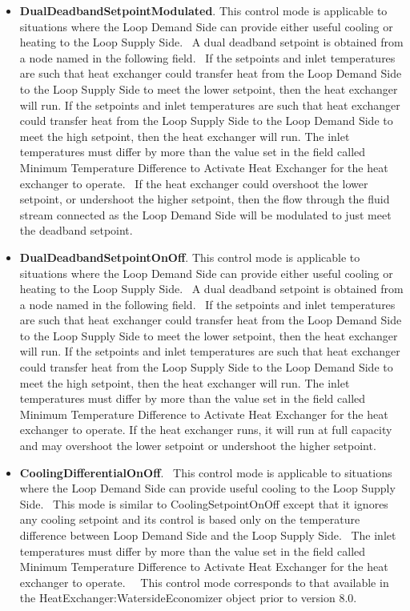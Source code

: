 \begin{itemize}
\item
  \textbf{DualDeadbandSetpointModulated}. This control mode is applicable to situations where the Loop Demand Side can provide either useful cooling or heating to the Loop Supply Side.~ A dual deadband setpoint is obtained from a node named in the following field.~ If the setpoints and inlet temperatures are such that heat exchanger could transfer heat from the Loop Demand Side to the Loop Supply Side to meet the lower setpoint, then the heat exchanger will run. If the setpoints and inlet temperatures are such that heat exchanger could transfer heat from the Loop Supply Side to the Loop Demand Side to meet the high setpoint, then the heat exchanger will run. The inlet temperatures must differ by more than the value set in the field called Minimum Temperature Difference to Activate Heat Exchanger for the heat exchanger to operate.~ If the heat exchanger could overshoot the lower setpoint, or undershoot the higher setpoint, then the flow through the fluid stream connected as the Loop Demand Side will be modulated to just meet the deadband setpoint.
\item
  \textbf{DualDeadbandSetpointOnOff}. This control mode is applicable to situations where the Loop Demand Side can provide either useful cooling or heating to the Loop Supply Side.~ A dual deadband setpoint is obtained from a node named in the following field.~ If the setpoints and inlet temperatures are such that heat exchanger could transfer heat from the Loop Demand Side to the Loop Supply Side to meet the lower setpoint, then the heat exchanger will run. If the setpoints and inlet temperatures are such that heat exchanger could transfer heat from the Loop Supply Side to the Loop Demand Side to meet the high setpoint, then the heat exchanger will run. The inlet temperatures must differ by more than the value set in the field called Minimum Temperature Difference to Activate Heat Exchanger for the heat exchanger to operate. If the heat exchanger runs, it will run at full capacity and may overshoot the lower setpoint or undershoot the higher setpoint.
\item
  \textbf{CoolingDifferentialOnOff}.~ This control mode is applicable to situations where the Loop Demand Side can provide useful cooling to the Loop Supply Side.~ This mode is similar to CoolingSetpointOnOff except that it ignores any cooling setpoint and its control is based only on the temperature difference between Loop Demand Side and the Loop Supply Side.~ The inlet temperatures must differ by more than the value set in the field called Minimum Temperature Difference to Activate Heat Exchanger for the heat exchanger to operate.~ ~This control mode corresponds to that available in the HeatExchanger:WatersideEconomizer object prior to version 8.0.

\end{itemize}
